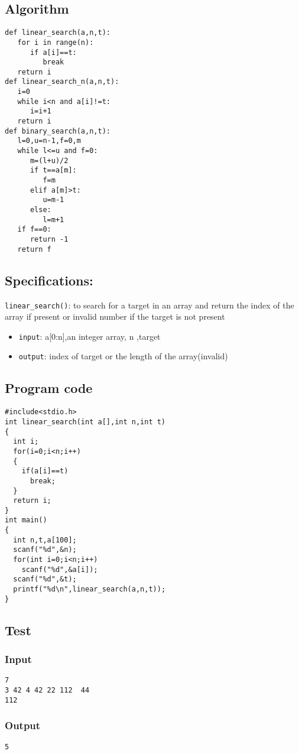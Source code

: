 \documentclass[11pt]{article}
\begin{document}
\subsection*{Algorithm}
\label{sec-6-3}
\begin{verbatim}
def linear_search(a,n,t):
   for i in range(n):
      if a[i]==t:
         break
   return i
def linear_search_n(a,n,t):
   i=0
   while i<n and a[i]!=t:
      i=i+1
   return i
def binary_search(a,n,t):
   l=0,u=n-1,f=0,m
   while l<=u and f=0:
      m=(l+u)/2
      if t==a[m]:
         f=m
      elif a[m]>t:
         u=m-1
      else:
         l=m+1
   if f==0:
      return -1
   return f
\end{verbatim}
\subsection*{Specifications:}
\label{sec-6-4}
\texttt{linear\_search()}: to search for a target in an array and return the index of the array if present or 
invalid number if the target is not present
\begin{itemize}
\item \texttt{input}: a[0:n],an integer array, n ,target
\item \texttt{output}: index of target or the length of the array(invalid)
\end{itemize}

\subsection*{Program code}
\label{sec-6-5}
\begin{verbatim}
#include<stdio.h>
int linear_search(int a[],int n,int t)
{
  int i;
  for(i=0;i<n;i++)
  {
    if(a[i]==t)
      break;
  }
  return i;
}
int main()
{
  int n,t,a[100];
  scanf("%d",&n);
  for(int i=0;i<n;i++)
    scanf("%d",&a[i]);
  scanf("%d",&t);
  printf("%d\n",linear_search(a,n,t));
}
\end{verbatim}
\subsection*{Test}
\label{sec-6-6}
\subsubsection*{Input}
\label{sec-6-6-1}
\begin{verbatim}
7
3 42 4 42 22 112  44
112
\end{verbatim}
\subsubsection*{Output}
\label{sec-6-6-2}
\begin{verbatim}
5
\end{verbatim}
\end{document}
